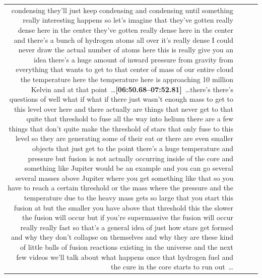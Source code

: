 \documentclass[10pt]{article}
\begin{document}
\begin{tiny}
\begin{longtable}{r p{0.3in} p{1.212in} p{3.8in}}
condensing they'll just keep condensing and condensing until something really interesting happens so let's imagine that they've gotten really dense here in the center they've gotten really dense here in the center and there's a bunch of hydrogen atoms all over it's really dense I could never draw the actual number of atoms here this is really give you an idea there's a huge amount of inward pressure from gravity from everything that wants to get to that center of mass of our entire cloud the temperature here the temperature here is approaching 10 million Kelvin and at that point~\ldots\smallskip\newline\textbf{[06:50.68--07:52.81]}~\ldots there's there's questions of well what if what if there just wasn't enough mass to get to this level over here and there actually are things that never get to that quite that threshold to fuse all the way into helium there are a few things that don't quite make the threshold of stars that only fuse to this level so they are generating some of their eat or there are even smaller objects that just get to the point there's a huge temperature and pressure but fusion is not actually occurring inside of the core and something like Jupiter would be an example and you can go several several masses above Jupiter where you get something like that so you have to reach a certain threshold or the mass where the pressure and the temperature due to the heavy mass gets so large that you start this fusion at but the smaller you have above that threshold this the slower the fusion will occur but if you're supermassive the fusion will occur really really fast so that's a general idea of just how stars get formed and why they don't collapse on themselves and why they are these kind of little balls of fusion reactions existing in the universe and the next few videos we'll talk about what happens once that hydrogen fuel and the cure in the core starts to run out~\ldots \\

\end{longtable}
\end{tiny}
\end{document}
